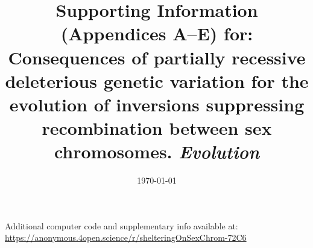 \documentclass{article}
\title{Supporting Information (Appendices A--E) for: Consequences of partially recessive deleterious genetic variation for the evolution of inversions suppressing recombination between sex chromosomes. \textit{Evolution}}
\date{\today}
\newcommand\hl[1]{%
  \bgroup
  \hskip0pt\color{blue!80!black}%
  #1%
  \egroup
}
\begin{document}
\maketitle



\bigskip

\noindent{} Additional computer code and supplementary info available at: \url{https://anonymous.4open.science/r/shelteringOnSexChrom-72C6}




\bigskip

\newpage

\tableofcontents

\newpage
\end{document}
